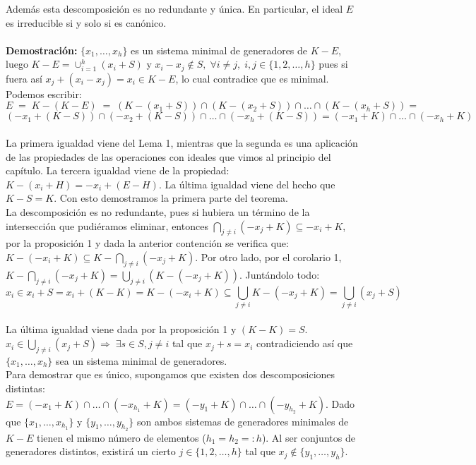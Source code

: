 \documentclass[11pt,spanish]{book}
\begin{document}
Además esta descomposición es no redundante y única. En particular, el ideal $E$ es irreducible si y solo si es canónico.\\  
\\ \textbf{Demostración: } $\{x_{1},\ldots,x_{h}\}$ es un sistema minimal de generadores de $K-E$, luego $K-E=\cup_{i=1}^{h}(x_{i}+S)$ y $x_{i}-x_{j}\notin S,\;\forall i\neq j,\; i,j\in\{1,2,\ldots,h\}$ pues si fuera así $x_{j}+(x_{i}-x_{j})=x_{i}\in K-E$, lo cual contradice que es minimal.\\

Podemos escribir:
$$E\; =\; K-(K-E)\;=\; (K-(x_{1}+S))\cap(K-(x_{2}+S))\cap \ldots\cap (K-(x_{h}+S)) =$$ $$(-x_{1}+(K-S))\cap(-x_{2}+(K-S))\cap \ldots\cap(-x_{h}+(K-S))=(-x_{1}+K)\cap \ldots \cap (-x_{h}+K)$$\\

La primera igualdad viene del Lema 1, mientras que la segunda es una aplicación de las propiedades de las operaciones con ideales que vimos al principio del capítulo. La tercera igualdad viene de la propiedad: $K-(x_{i}+H) = -x_{i}+(E-H)$. La última igualdad viene del hecho que $K-S=K$. Con esto demostramos la primera parte del teorema.\\

La descomposición es no redundante, pues si hubiera un término de la intersección que pudiéramos eliminar, entonces $\bigcap_{j\neq i}(-x_{j}+K)\subseteq -x_{i}+K$, por la proposición 1 y dada la anterior contención se verifica que: $K-(-x_{i}+K)\subseteq K-\bigcap_{j\neq i} (-x_{j}+K)$. Por otro lado, por el corolario 1,  $K -\bigcap_{j\neq i}(-x_{j}+K) = \bigcup_{j\neq i}(K-(-x_{j}+K))$. Juntándolo todo:  
$$x_{i}\in x_{i}+S =x_{i} + (K-K) = K-(-x_{i}+K)\subseteq \bigcup_{j\neq i} K-(-x_{j}+K)=\bigcup_{j\neq i}(x_{j}+S)$$\\

La última igualdad viene dada por la proposición 1 y $(K-K)=S$.
$x_{i}\in\bigcup_{j\neq i}(x_{j}+S)\Rightarrow\;\exists s\in S, j\neq i$ tal que $x_{j}+s=x_{i}$ contradiciendo así que $\{x_{1},\ldots,x_{h}\}$ sea un sistema minimal de generadores.\\

Para demostrar que es único, supongamos que existen dos descomposiciones distintas: $E=(-x_{1}+K)\cap \ldots \cap (-x_{h_{1}}+K)=(-y_{1}+K)\cap \ldots \cap (-y_{h_{2}}+K)$. Dado que $\{x_{1},\ldots,x_{h_{1}}\}$ y $\{y_{1},\ldots,y_{h_{2}}\}$ son ambos sistemas de generadores minimales de $K-E$ tienen el mismo número de elementos ($h_{1}=h_{2}=:h$). Al ser conjuntos de generadores distintos, existirá un cierto $j\in\{1,2,\ldots,h\}$ tal que $x_{j}\notin \{y_{1},\ldots,y_{h}\}$.\\
\end{document}
